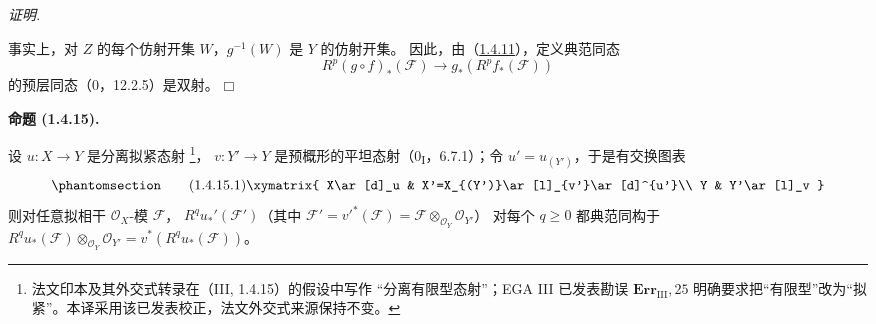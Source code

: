 \documentclass[UTF8,fontset=none,11pt,oneside,openany]{ctexbook}
\providecommand{\square}{\mdlgwhtsquare}
\newcommand{\SourceCorrectionNote}[1]{\footnote{#1}}
\newenvironment{proposition}[1][]{%
  \par\medskip\noindent\textbf{命题 (#1).}\ %
}{\par}
\newenvironment{proof}{%
  \par\smallskip\noindent\textit{证明.}\ %
}{\hfill$\square$\par}
\let\EGAOriginalLabel\label
\renewcommand{\label}[1]{\phantomsection\EGAOriginalLabel{#1}}
\begin{document}
\begin{proof}
事实上，对 $Z$ 的每个仿射开集 $W$，$g^{-1}(W)$ 是 $Y$ 的仿射开集。
因此，由（\hyperref[III.1.4.11-fr]{1.4.11}），定义典范同态
\[
R^p(g\circ f)_*(\mathcal F)\longrightarrow g_*(R^pf_*(\mathcal F))
\]
的预层同态（0，12.2.5）是双射。
\end{proof}

\begin{proposition}[1.4.15]
\label{III.1.4.15-fr}
设 $u:X\to Y$ 是分离拟紧态射
\SourceCorrectionNote{法文印本及其外交式转录在（III, 1.4.15）的假设中写作
“分离有限型态射”；EGA III 已发表勘误 $\mathbf{Err}_{\mathrm{III}},25$
明确要求把“有限型”改为“拟紧”。本译采用该已发表校正，法文外交式来源保持不变。}，
$v:Y'\to Y$ 是预概形的平坦态射（0\textsubscript{I}，6.7.1）；令
$u'=u_{(Y')}$，于是有交换图表
\begin{equation}
\label{III.1.4.15.1-fr}
\tag{1.4.15.1}
\xymatrix{
X\ar[d]_u & X'=X_{(Y')}\ar[l]_{v'}\ar[d]^{u'}\\
Y & Y'\ar[l]_v
}
\end{equation}
则对任意拟相干 $\mathcal O_X$-模 $\mathcal F$，
$R^qu_*'(\mathcal F')$（其中
$\mathcal F'=v'^*(\mathcal F)=\mathcal F\otimes_{\mathcal O_Y}\mathcal O_{Y'}$）
对每个 $q\geq0$ 都典范同构于
$R^qu_*(\mathcal F)\otimes_{\mathcal O_Y}\mathcal O_{Y'}
=v^*(R^qu_*(\mathcal F))$。
\end{proposition}
\end{document}
